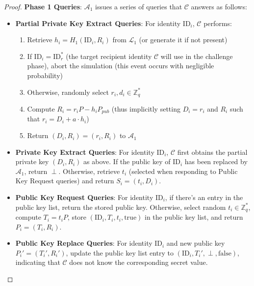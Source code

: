 \documentclass[10pt]{article}
\newtheorem{proof}{Proof}
\begin{document}
\begin{proof}
\textbf{Phase 1 Queries}:
$\mathcal{A}_1$ issues a series of queries that $\mathcal{C}$ answers as follows:

\begin{itemize}
    \item \textbf{Partial Private Key Extract Queries}: For identity $\text{ID}_i$, $\mathcal{C}$ performs:
    \begin{enumerate}
        \item Retrieve $h_i = H_1(\text{ID}_i, R_i)$ from $\mathcal{L}_1$ (or generate it if not present)
        \item If $\text{ID}_i = \text{ID}_r^*$ (the target recipient identity $\mathcal{C}$ will use in the challenge phase), abort the simulation (this event occurs with negligible probability)
        \item Otherwise, randomly select $r_i, d_i \in \mathbb{Z}_q^*$
        \item Compute $R_i = r_iP - h_i P_{pub}$ (thus implicitly setting $D_i = r_i$ and $R_i$ such that $r_i = D_i + a \cdot h_i$)
        \item Return $(D_i, R_i) = (r_i, R_i)$ to $\mathcal{A}_1$
    \end{enumerate}
    
    \item \textbf{Private Key Extract Queries}: For identity $\text{ID}_i$, $\mathcal{C}$ first obtains the partial private key $(D_i, R_i)$ as above. If the public key of $\text{ID}_i$ has been replaced by $\mathcal{A}_1$, return $\perp$. Otherwise, retrieve $t_i$ (selected when responding to Public Key Request queries) and return $S_i = (t_i, D_i)$.
    
    \item \textbf{Public Key Request Queries}: For identity $\text{ID}_i$, if there's an entry in the public key list, return the stored public key. Otherwise, select random $t_i \in \mathbb{Z}_q^*$, compute $T_i = t_i P$, store $(\text{ID}_i, T_i, t_i, \text{true})$ in the public key list, and return $P_i = (T_i, R_i)$.
    
    \item \textbf{Public Key Replace Queries}: For identity $\text{ID}_i$ and new public key $P_i' = (T_i', R_i')$, update the public key list entry to $(\text{ID}_i, T_i', \perp, \text{false})$, indicating that $\mathcal{C}$ does not know the corresponding secret value.
    

\end{itemize}
\end{proof}
\end{document}
